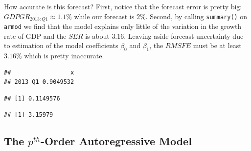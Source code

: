 \documentclass[]{book}
\newenvironment{Shaded}{\begin{snugshade}}{\end{snugshade}}
\newcommand{\KeywordTok}[1]{\textcolor[rgb]{0.13,0.29,0.53}{\textbf{#1}}}
\newcommand{\DataTypeTok}[1]{\textcolor[rgb]{0.13,0.29,0.53}{#1}}
\newcommand{\DecValTok}[1]{\textcolor[rgb]{0.00,0.00,0.81}{#1}}
\newcommand{\StringTok}[1]{\textcolor[rgb]{0.31,0.60,0.02}{#1}}
\newcommand{\CommentTok}[1]{\textcolor[rgb]{0.56,0.35,0.01}{\textit{#1}}}
\newcommand{\OperatorTok}[1]{\textcolor[rgb]{0.81,0.36,0.00}{\textbf{#1}}}
\newcommand{\NormalTok}[1]{#1}
\theoremstyle{definition}
\theoremstyle{definition}
\theoremstyle{definition}
\theoremstyle{remark}
\begin{document}
How accurate is this forecast? First, notice that the forecast error is
pretty big: \(GDPGR_{2013:Q1} \approx 1.1\%\) while our forecast is
\(2\%\). Second, by calling \texttt{summary()} on \texttt{armod} we find
that the model explains only little of the variation in the growth rate
of GDP and the \(SER\) is about \(3.16\). Leaving aside forecast
uncertainty due to estimation of the model coefficients \(\beta_0\) and
\(\beta_1\), the \(RMSFE\) must be at least \(3.16\%\) which is pretty
inaccurate.

\begin{Shaded}
\end{Shaded}

\begin{verbatim}
##                 x
## 2013 Q1 0.9049532
\end{verbatim}

\begin{Shaded}
\end{Shaded}

\begin{verbatim}
## [1] 0.1149576
\end{verbatim}

\begin{Shaded}
\end{Shaded}

\begin{verbatim}
## [1] 3.15979
\end{verbatim}

\subsection*{\texorpdfstring{The \(p^{th}\)-Order Autoregressive
Model}{The p\^{}\{th\}-Order Autoregressive Model}}\label{the-pth-order-autoregressive-model}
\end{document}
